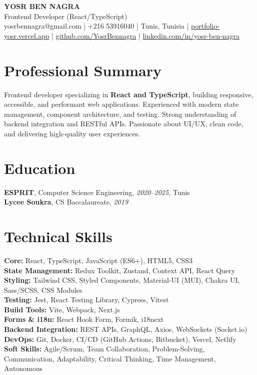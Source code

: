 \documentclass[10pt,a4paper]{article}
\begin{document}
\begin{center}
  {\Large\bfseries YOSR BEN NAGRA}\\[2pt]
  {\small Frontend Developer (React/TypeScript)}\\[3pt]
  {\footnotesize yosrbennagra@gmail.com \;|\; +216 53916040 \;|\; Tunis, Tunisia \;|\; \href{https://portfolio-yosr.vercel.app/en}{portfolio-yosr.vercel.app} \;|\; \href{https://github.com/YosrBennagra}{github.com/YosrBennagra} \;|\; \href{https://www.linkedin.com/in/yosr-ben-nagra/}{linkedin.com/in/yosr-ben-nagra}}
\end{center}

\section*{Professional Summary}
{\small
Frontend developer specializing in \textbf{React and TypeScript}, building responsive, accessible, and performant web applications. Experienced with modern state management, component architecture, and testing. Strong understanding of backend integration and RESTful APIs. Passionate about UI/UX, clean code, and delivering high-quality user experiences.
}

\vspace{4pt}

\section*{Education}
{\small
\textbf{ESPRIT}, Computer Science Engineering, \textit{2020--2025}, Tunis\\[1pt]
\textbf{Lycee Soukra}, CS Baccalaureate, \textit{2019}
}

\vspace{4pt}

\section*{Technical Skills}
{\small
\textbf{Core:} React, TypeScript, JavaScript (ES6+), HTML5, CSS3\\[2pt]
\textbf{State Management:} Redux Toolkit, Zustand, Context API, React Query\\[2pt]
\textbf{Styling:} Tailwind CSS, Styled Components, Material-UI (MUI), Chakra UI, Sass/SCSS, CSS Modules\\[2pt]
\textbf{Testing:} Jest, React Testing Library, Cypress, Vitest\\[2pt]
\textbf{Build Tools:} Vite, Webpack, Next.js\\[2pt]
\textbf{Forms \& i18n:} React Hook Form, Formik, i18next\\[2pt]
\textbf{Backend Integration:} REST APIs, GraphQL, Axios, WebSockets (Socket.io)\\[2pt]
\textbf{DevOps:} Git, Docker, CI/CD (GitHub Actions, Bitbucket), Vercel, Netlify\\[2pt]
\textbf{Soft Skills:} Agile/Scrum, Team Collaboration, Problem-Solving, Communication, Adaptability, Critical Thinking, Time Management, Autonomous
}
\end{document}

